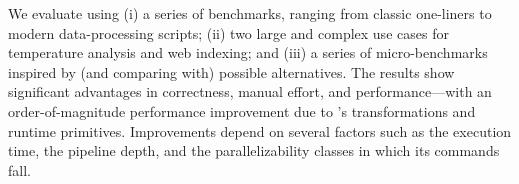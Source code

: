 \documentclass[letterpaper,twocolumn,10pt]{article}
\newcommand{\ttt}[1]{\texttt{#1}}
\begin{document}

% 
% 

We evaluate \sys using
  (i) a series of benchmarks, ranging from classic \unix one-liners to modern data-processing scripts;
  (ii) two large and complex use cases for temperature analysis and web indexing;
and 
  (iii) a series of micro-benchmarks inspired by (and
comparing with) possible alternatives.  The results show
significant advantages in correctness, manual effort,
and performance---with an order-of-magnitude performance
improvement due to \sys's transformations and runtime primitives.
Improvements depend on several factors such as the execution time, the pipeline depth, and the parallelizability classes in which its commands fall. 
\end{document}

